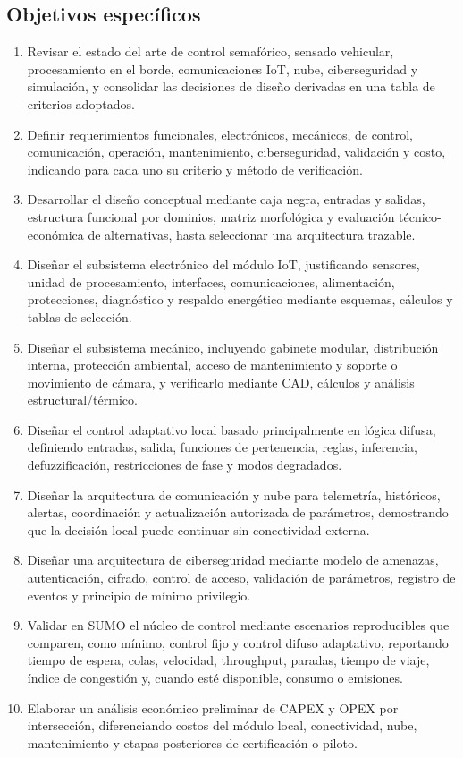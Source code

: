 \documentclass[12pt,a4paper,oneside]{report}
\begin{document}
\subsection{Objetivos específicos}\label{objetivos-especuxedficos}

\begin{enumerate}[label=\textbf{OE\arabic*:},leftmargin=1.7cm]
\item Revisar el estado del arte de control semafórico, sensado vehicular, procesamiento en el borde, comunicaciones IoT, nube, ciberseguridad y simulación, y consolidar las decisiones de diseño derivadas en una tabla de criterios adoptados.
\item Definir requerimientos funcionales, electrónicos, mecánicos, de control, comunicación, operación, mantenimiento, ciberseguridad, validación y costo, indicando para cada uno su criterio y método de verificación.
\item Desarrollar el diseño conceptual mediante caja negra, entradas y salidas, estructura funcional por dominios, matriz morfológica y evaluación técnico-económica de alternativas, hasta seleccionar una arquitectura trazable.
\item Diseñar el subsistema electrónico del módulo IoT, justificando sensores, unidad de procesamiento, interfaces, comunicaciones, alimentación, protecciones, diagnóstico y respaldo energético mediante esquemas, cálculos y tablas de selección.
\item Diseñar el subsistema mecánico, incluyendo gabinete modular, distribución interna, protección ambiental, acceso de mantenimiento y soporte o movimiento de cámara, y verificarlo mediante CAD, cálculos y análisis estructural/térmico.
\item Diseñar el control adaptativo local basado principalmente en lógica difusa, definiendo entradas, salida, funciones de pertenencia, reglas, inferencia, defuzzificación, restricciones de fase y modos degradados.
\item Diseñar la arquitectura de comunicación y nube para telemetría, históricos, alertas, coordinación y actualización autorizada de parámetros, demostrando que la decisión local puede continuar sin conectividad externa.
\item Diseñar una arquitectura de ciberseguridad mediante modelo de amenazas, autenticación, cifrado, control de acceso, validación de parámetros, registro de eventos y principio de mínimo privilegio.
\item Validar en SUMO el núcleo de control mediante escenarios reproducibles que comparen, como mínimo, control fijo y control difuso adaptativo, reportando tiempo de espera, colas, velocidad, throughput, paradas, tiempo de viaje, índice de congestión y, cuando esté disponible, consumo o emisiones.
\item Elaborar un análisis económico preliminar de CAPEX y OPEX por intersección, diferenciando costos del módulo local, conectividad, nube, mantenimiento y etapas posteriores de certificación o piloto.
\end{enumerate}
\end{document}
